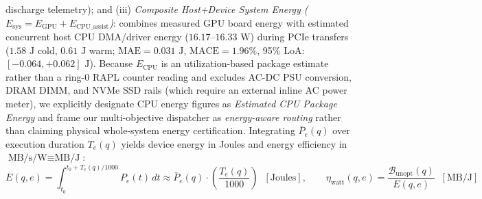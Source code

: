 \documentclass[10pt,a4paper]{article}
\begin{document}
\begin{enumerate}[leftmargin=1.5em,itemsep=3pt]
discharge telemetry); and (iii) \emph{Composite Host+Device System Energy ($E_{\text{sys}} = E_{\text{GPU}} + E_{\text{CPU\_assist}}$)}: combines measured GPU board energy with estimated concurrent host CPU DMA/driver energy ($16.17\text{--}16.33\text{ W}$) during PCIe transfers ($1.58\text{ J}$ cold, $0.61\text{ J}$ warm; $\text{MAE} = 0.031\text{ J}$, $\text{MACE} = 1.96\%$, 95\% LoA: $[-0.064, +0.062]\text{ J}$). Because $E_{\text{CPU}}$ is an utilization-based package estimate rather than a ring-0 RAPL counter reading and excludes AC-DC PSU conversion, DRAM DIMM, and NVMe SSD rails (which require an external inline AC power meter), we explicitly designate CPU energy figures as \emph{Estimated CPU Package Energy} and frame our multi-objective dispatcher as \emph{energy-aware routing} rather than claiming physical whole-system energy certification. Integrating $\bar{P}_e(q)$ over execution duration $T_e(q)$ yields device energy in Joules and energy efficiency in $\text{MB/s/W} \equiv \text{MB/J}$:
\begin{equation}
        E(q, e) = \int_{t_0}^{t_0 + T_e(q)/1000} P_e(t)\,dt \approx \bar{P}_e(q) \cdot \left(\frac{T_e(q)}{1000}\right) \;\; [\text{Joules}], \qquad \eta_{\text{watt}}(q, e) = \frac{\mathcal{B}_{\text{unopt}}(q)}{E(q, e)} \;\; [\text{MB/J}]
    \end{equation}
\end{enumerate}
\end{document}
